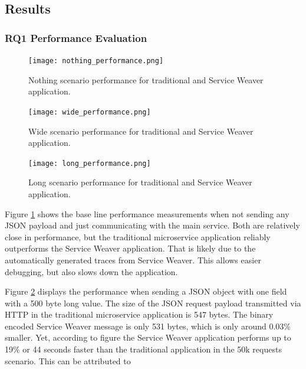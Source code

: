 \documentclass[sigconf,review,9pt]{acmart}
\begin{document}
\subsection{Results}

\subsubsection{RQ1 Performance Evaluation}

\begin{figure}
	\texttt{[image: nothing\_performance.png]}
	\caption{Nothing scenario performance for traditional and Service Weaver application.}
	\label{fig:nothing_performance}
\end{figure}

\begin{figure}
	\texttt{[image: wide\_performance.png]}
	\caption{Wide scenario performance for traditional and Service Weaver application.}
	\label{fig:wide_performance}
\end{figure}

\begin{figure}
	\texttt{[image: long\_performance.png]}
	\caption{Long scenario performance for traditional and Service Weaver application.}
	\label{fig:long_performance}
\end{figure}

Figure \ref{fig:nothing_performance} shows the base line performance measurements
when not sending any JSON payload and just communicating with the main service.
Both are relatively close in performance, but the traditional microservice application
reliably outperforms the Service Weaver application.
That is likely due to the automatically generated traces from Service Weaver.
This allows easier debugging, but also slows down the application.

Figure \ref{fig:wide_performance} displays the performance when sending a JSON object
with one field with a 500 byte long value.
The size of the JSON request payload transmitted via HTTP in the traditional microservice
application is 547 bytes.
The binary encoded Service Weaver message is only 531 bytes, which is only around
0.03\% smaller.
Yet, according to figure  the Service Weaver application
performs up to 19\% or 44 seconds faster than the traditional application in the 50k requests scenario.
This can be attributed to


\end{document}

